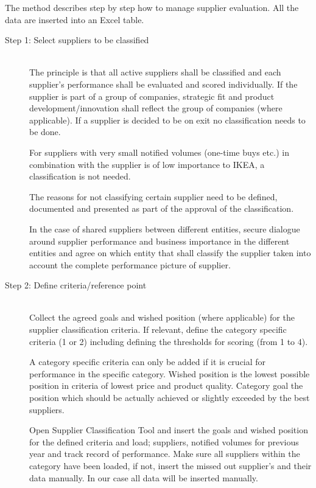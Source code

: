 \documentclass[oneside,12pt]{article}%
\begin{document}
The method describes step by step how to manage supplier evaluation. All the data are inserted into an Excel table.


\begin{description}
  \item[Step 1: Select suppliers to be classified] \hfill \\
  The principle is that all active suppliers shall be classified and each supplier’s performance shall be evaluated and scored individually. If the supplier is part of a group of companies, strategic fit and product development/innovation shall reflect the group of companies (where applicable). If a supplier is decided to be on exit no classification needs to be done. \par
  For suppliers with very small notified volumes (one-time buys etc.) in combination with the supplier is of low importance to IKEA, a classification is not needed. \par
  The reasons for not classifying certain supplier need to be defined, documented and presented as part of the approval of the classification. \par
  In the case of shared suppliers between different entities, secure dialogue around supplier performance and business importance in the different entities and agree on which entity that shall classify the supplier taken into account the complete performance picture of supplier.


  \item[Step 2: Define criteria/reference point] \hfill \\
  Collect the agreed goals and wished position (where applicable) for the supplier classification criteria. If relevant, define the category specific criteria (1 or 2) including defining the thresholds for scoring (from 1 to 4).\par
  A category specific criteria can only be added if it is crucial for performance in the specific category. \apr
  Wished position is the lowest possible position in criteria of lowest price and product quality. Category goal the position which should be actually achieved or slightly exceeded by the best suppliers.\par
  Open Supplier Classification Tool and insert the goals and wished position for the defined criteria and load; suppliers, notified volumes for previous year and track record of performance. Make sure all suppliers within the category have been loaded, if not, insert the missed out supplier's and their data manually. In our case all data will be inserted manually.


\end{description}
\end{document}

